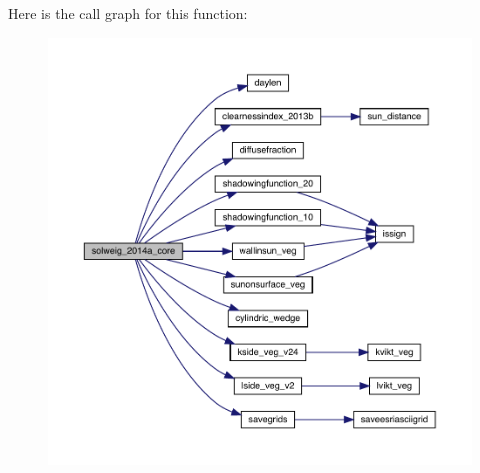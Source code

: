 Here is the call graph for this function\+:\nopagebreak
\begin{figure}[H]
\begin{center}
\leavevmode
\includegraphics[width=350pt]{_s_o_l_w_e_i_g__2014a__core_8f95_a16c0a3ea3be2afe58b9d3308aa479d8f_cgraph}
\end{center}
\end{figure}
